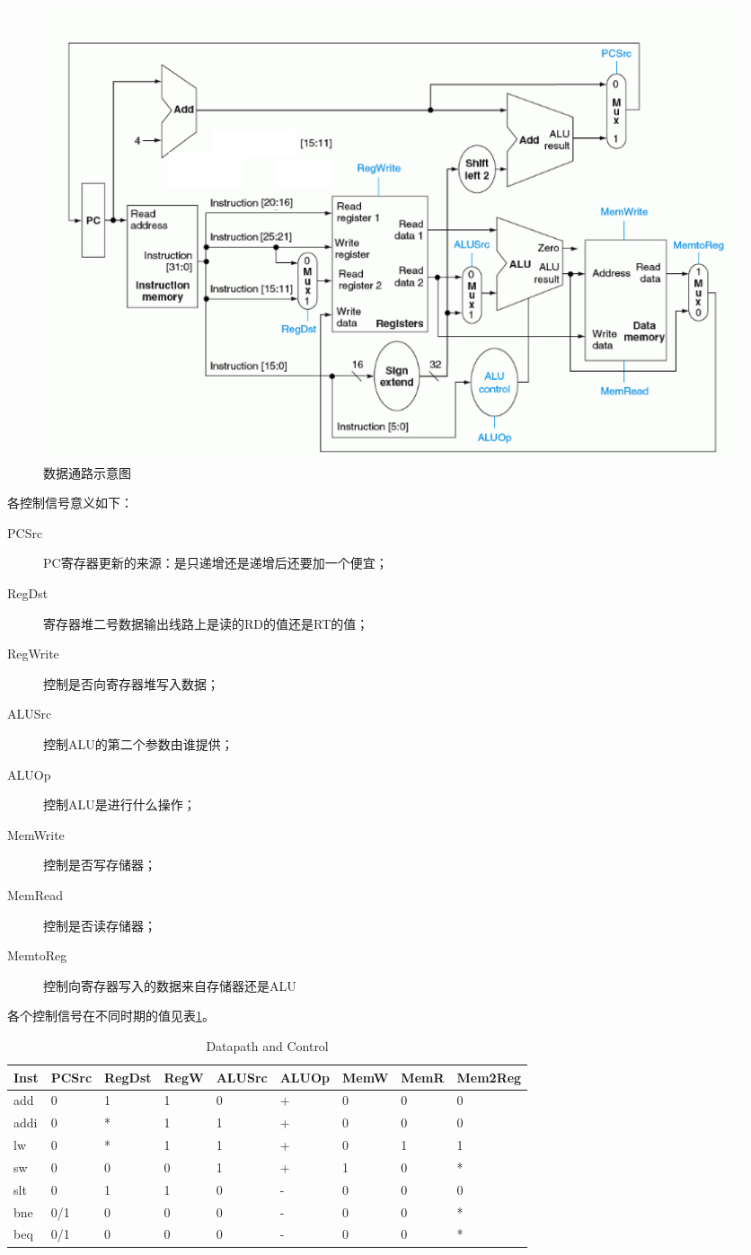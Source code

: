 \documentclass[a4paper,dvipdfm]{ctexart}
\begin{document}
\begin{figure}[hbt!]
  \centering
  \includegraphics[width=1.2\textwidth]{datapath.png}
  \caption{数据通路示意图}
  \label{fig:datapath}
\end{figure}

各控制信号意义如下：
\begin{description}
\item[PCSrc] PC寄存器更新的来源：是只递增还是递增后还要加一个便宜；
\item[RegDst] 寄存器堆二号数据输出线路上是读的RD的值还是RT的值；
\item[RegWrite] 控制是否向寄存器堆写入数据；
\item[ALUSrc] 控制ALU的第二个参数由谁提供；
\item[ALUOp] 控制ALU是进行什么操作；
\item[MemWrite] 控制是否写存储器；
\item[MemRead] 控制是否读存储器；
\item[MemtoReg] 控制向寄存器写入的数据来自存储器还是ALU
\end{description}

各个控制信号在不同时期的值见表\ref{tab:dc}。

\begin{table}[hbt!]
  \centering
  \begin{tabular}{|l|l|l|l|l|l|l|l|l|}
    \hline
    Inst&PCSrc&RegDst&RegW&ALUSrc&ALUOp&MemW&MemR&Mem2Reg\\
    \hline
    add&0&1&1&0&+&0&0&0\\
    addi&0&*&1&1&+&0&0&0\\
    lw&0&*&1&1&+&0&1&1\\
    sw&0&0&0&1&+&1&0&*\\
    slt&0&1&1&0&-&0&0&0\\
    bne&0/1&0&0&0&-&0&0&*\\
    beq&0/1&0&0&0&-&0&0&*\\
    \hline
  \end{tabular}
  \caption{Datapath and Control}
  \label{tab:dc}
\end{table}
\end{document}
